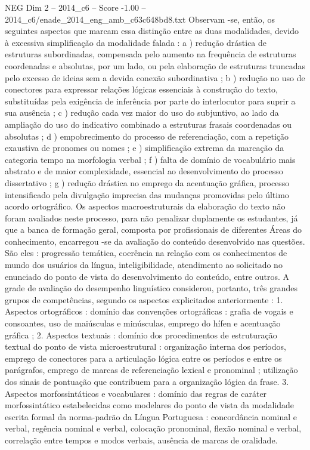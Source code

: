 \begin{textsample}{NEG Dim 2 – 2014\_c6 – Score -1.00 – 2014\_c6/enade\_2014\_eng\_amb\_c63c648bd8.txt}
Observam -se, então, os seguintes aspectos que marcam essa distinção entre as duas modalidades, devido à excessiva simplificação da modalidade falada : a ) redução drástica de estruturas subordinadas, compensada pelo aumento na frequência de estruturas coordenadas e absolutas, por um lado, ou pela elaboração de estruturas truncadas pelo excesso de ideias sem a devida conexão subordinativa ; b ) redução no uso de conectores para expressar relações lógicas essenciais à construção do texto, substituídas pela exigência de inferência por parte do interlocutor para suprir a sua ausência ; c ) redução cada vez maior do uso do subjuntivo, ao lado da ampliação do uso do indicativo combinado a estruturas frasais coordenadas ou absolutas ; d ) empobrecimento do processo de referenciação, com a repetição exaustiva de pronomes ou nomes ; e ) simplificação extrema da marcação da categoria tempo na morfologia verbal ; f ) falta de domínio de vocabulário mais abstrato e de maior complexidade, essencial ao desenvolvimento do processo dissertativo ; g ) redução drástica no emprego da acentuação gráfica, processo intensificado pela divulgação imprecisa das mudanças promovidas pelo último acordo ortográfico.
Os aspectos macroestruturais da elaboração do texto não foram avaliados neste processo, para não penalizar duplamente os estudantes, já que a banca de formação geral, composta por profissionais de diferentes Áreas do conhecimento, encarregou -se da avaliação do conteúdo desenvolvido nas questões.
São eles : progressão temática, coerência na relação com os conhecimentos de mundo dos usuários da língua, inteligibilidade, atendimento ao solicitado no enunciado do ponto de vista do desenvolvimento do conteúdo, entre outros.
A grade de avaliação do desempenho linguístico considerou, portanto, três grandes grupos de competências, segundo os aspectos explicitados anteriormente : 1.
Aspectos ortográficos : domínio das convenções ortográficas : grafia de vogais e consoantes, uso de maiúsculas e minúsculas, emprego do hífen e acentuação gráfica ; 2.
Aspectos textuais : domínio dos procedimentos de estruturação textual do ponto de vista microestrutural : organização interna dos períodos, emprego de conectores para a articulação lógica entre os períodos e entre os parágrafos, emprego de marcas de referenciação lexical e pronominal ; utilização dos sinais de pontuação que contribuem para a organização lógica da frase. 3.
Aspectos morfossintáticos e vocabulares : domínio das regras de caráter morfossintático estabelecidas como modelares do ponto de vista da modalidade escrita formal da norma-padrão da Língua Portuguesa : concordância nominal e verbal, regência nominal e verbal, colocação pronominal, flexão nominal e verbal, correlação entre tempos e modos verbais, ausência de marcas de oralidade.

\end{textsample}

